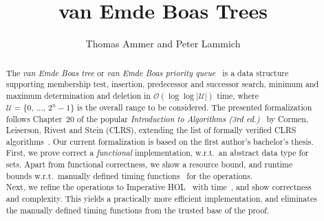 \documentclass[11pt,a4paper]{article}
\begin{document}
\title{van Emde Boas Trees}
\author{Thomas Ammer and Peter Lammich}
\maketitle

\begin{abstract}
  \indent The \textit{van Emde Boas tree} or \textit{van Emde Boas priority queue}~\cite{4567861, Emde_Boas_1976} is a data structure supporting membership test, insertion, predecessor and successor search, minimum and maximum determination and deletion in $\mathcal{O}(\log \log \vert \mathcal{U}\vert)$ time, where $\mathcal{U} = \lbrace0, \, ...,\, 2^n-1 \rbrace$ is the overall range to be considered.
  The presented formalization follows Chapter~20 of the popular \textit{Introduction to Algorithms (3rd ed.)}~\cite{10.5555/1614191} by Cormen, Leiserson, Rivest and Stein (CLRS), extending the list
  of formally verified CLRS algorithms~\cite{NipkowEH-ATVA20}. Our current formalization is based on the first author's bachelor's thesis.\\
  \indent First, we prove correct a \emph{functional} implementation, w.r.t.\ an abstract data type for sets.
  Apart from functional correctness, we show a resource bound, and runtime bounds w.r.t.\ manually
  defined timing functions~\cite{funalgs} for the operations.\\
  \indent Next, we refine the operations to Imperative HOL~\cite{Separation_Logic_Imperative_HOL-AFP, refimp}
  with time~\cite{zhan2018verifying}, and show correctness and complexity. This yields a practically more efficient implementation,
  and eliminates the manually defined timing functions from the trusted base of the proof.
\end{abstract}

\end{document}
